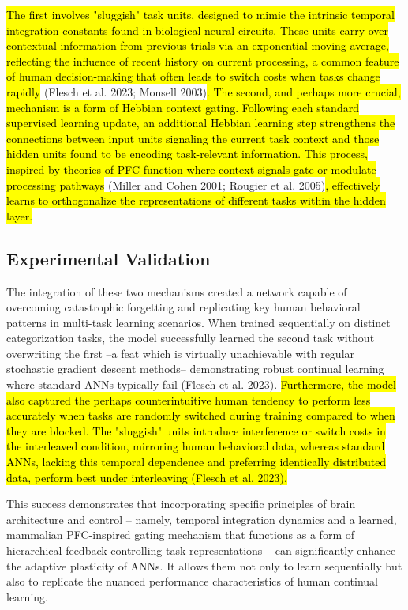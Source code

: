 \documentclass[
10pt, %
a4paper, %
oneside, %
headinclude,footinclude, %
BCOR5mm, %
]{scrartcl}
\begin{document}
\hl{The first involves "sluggish" task units, designed to mimic the intrinsic temporal integration constants found in biological neural circuits. These units carry over contextual information from previous trials via an exponential moving average, reflecting the influence of recent history on current processing, a common feature of human decision-making that often leads to switch costs when tasks change rapidly }(Flesch et al. 2023; Monsell 2003)\hl{. The second, and perhaps more crucial, mechanism is a form of Hebbian context gating. Following each standard supervised learning update, an additional Hebbian learning step strengthens the connections between input units signaling the current task context and those hidden units found to be encoding task-relevant information. This process, inspired by theories of PFC function where context signals gate or modulate processing pathways }(Miller and Cohen 2001; Rougier et al. 2005)\hl{, effectively learns to orthogonalize the representations of different tasks within the hidden layer.}

\subsection{Experimental Validation}

The integration of these two mechanisms created a network capable of overcoming catastrophic forgetting and replicating key human behavioral patterns in multi-task learning scenarios. When trained sequentially on distinct categorization tasks, the model successfully learned the second task without overwriting the first –a feat which is virtually unachievable with regular stochastic gradient descent methods– demonstrating robust continual learning where standard ANNs typically fail (Flesch et al. 2023). \hl{Furthermore, the model also captured the perhaps counterintuitive human tendency to perform less accurately when tasks are randomly switched during training compared to when they are blocked. The "sluggish" units introduce interference or switch costs in the interleaved condition, mirroring human behavioral data, whereas standard ANNs, lacking this temporal dependence and preferring identically distributed data, perform best under interleaving (Flesch et al. 2023).}

This success demonstrates that incorporating specific principles of brain architecture and control – namely, temporal integration dynamics and a learned, mammalian PFC-inspired gating mechanism that functions as a form of hierarchical feedback controlling task representations – can significantly enhance the adaptive plasticity of ANNs. It allows them not only to learn sequentially but also to replicate the nuanced performance characteristics of human continual learning.
\end{document}
